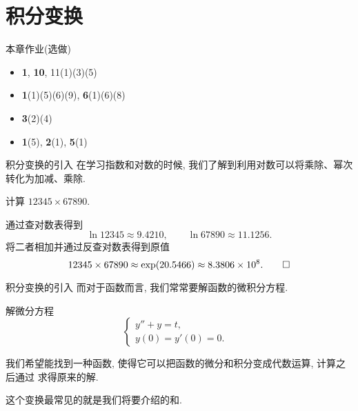 \part{积分变换}


\begin{frame}[<*>]{本章作业(选做)}
\begin{itemize}
\item {} \textbf{1}, \textbf{10}, {11}(1)(3)(5)
\item {} \textbf{1}(1)(5)(6)(9), \textbf{6}(1)(6)(8)
\item {} \textbf{3}(2)(4)
\item {} \textbf{1}(5), \textbf{2}(1), \textbf{5}(1)
\end{itemize}
\end{frame}


\begin{frame}{积分变换的引入}
\onslide<+->
在学习指数和对数的时候, 我们了解到利用对数可以将乘除、幂次转化为加减、乘除.
\begin{example}
计算 $12345\times 67890$.
\end{example}
\begin{solution}
通过查对数表得到
\[\ln 12345\approx 9.4210,\qquad\ln 67890\approx 11.1256.\]
\onslide<+->
将二者相加并通过反查对数表得到原值
\[12345\times 67890\approx \exp(20.5466)\approx 8.3806\times 10^8.\qedhere\]
\end{solution}
\end{frame}


\begin{frame}{积分变换的引入}
\onslide<+->
而对于函数而言, 我们常常要解函数的微积分方程.
\begin{example}
解微分方程
	\[\begin{cases}
		y''+y=t	,&\\
		y(0)=y'(0)=0.&
	\end{cases}\]
\end{example}
\begin{solutions}
\indent
我们希望能找到一种函数, 使得它可以把函数的微分和积分变成代数运算, 计算之后通过 求得原来的解.

\indent
\onslide<+->
这个变换最常见的就是我们将要介绍的和.
\end{solutions}
\end{frame}

